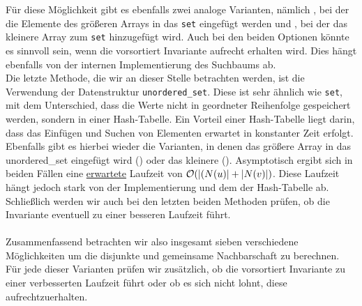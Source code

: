 Für diese Möglichkeit gibt es ebenfalls zwei 
analoge Varianten, nämlich \SetSea, bei der die Elemente des größeren Arrays in das \texttt{set} eingefügt werden
und \SeaSet, bei der das kleinere Array zum \texttt{set} hinzugefügt wird.
Auch bei den beiden Optionen könnte es sinnvoll sein, wenn die vorsortiert Invariante aufrecht erhalten wird.
Dies hängt ebenfalls von der internen Implementierung des Suchbaums ab.
\\
Die letzte Methode, die wir an dieser Stelle betrachten werden,
ist die Verwendung der Datenstruktur \texttt{unordered\_set}. Diese ist sehr ähnlich wie \texttt{set}, mit
dem Unterschied, dass die Werte nicht in geordneter Reihenfolge gespeichert werden, sondern
in einer Hash-Tabelle. Ein Vorteil einer Hash-Tabelle liegt darin, 
dass das Einfügen und Suchen von Elementen
erwartet in konstanter Zeit erfolgt.
Ebenfalls gibt es hierbei wieder die Varianten, 
in denen das größere Array in das unordered\_set eingefügt wird (\USetSea) 
oder das kleinere (\SeaUSet).{}
Asymptotisch ergibt sich in beiden Fällen eine \underline{erwartete} Laufzeit von $\mathcal{O}(|(N(u)| + |N(v)|)$.
Diese Laufzeit hängt jedoch stark von der Implementierung und dem   der Hash-Tabelle ab. 
Schließlich werden wir auch bei den letzten beiden Methoden prüfen,
 ob die Invariante eventuell zu einer besseren Laufzeit führt.
\\
\\
Zusammenfassend betrachten wir also insgesamt sieben verschiedene Möglichkeiten um die disjunkte
und gemeinsame Nachbarschaft zu berechnen. Für jede dieser Varianten prüfen wir zusätzlich,
ob die vorsortiert Invariante zu einer verbesserten Laufzeit führt oder ob es sich
nicht lohnt, diese aufrechtzuerhalten.



